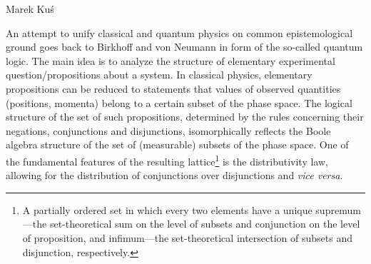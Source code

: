 \begin{artengenv}{Marek Ku\'s}

     

An attempt to unify classical and quantum physics on common epistemological ground goes back to Birkhoff and von Neumann \parencite*{birkhoff_logic_1936} in form of the so-called quantum logic. The main idea is to analyze the structure of elementary experimental question/propositions about a system. In classical physics, elementary propositions can be reduced to statements that values of observed quantities (positions, momenta) belong to a certain subset of the phase space. The logical structure of the set of such propositions, determined by the rules concerning their negations, conjunctions and disjunctions, isomorphically reflects the Boole algebra structure of the set of (measurable) subsets of  the phase space. One of the fundamental features of the resulting lattice\footnote{A partially ordered set in which every two elements have a unique supremum---the set-theoretical sum on the level of subsets and conjunction on the level of proposition, and infimum---the  set-theoretical intersection of subsets and disjunction, respectively.} is the distributivity law, allowing for the distribution of conjunctions over disjunctions and \textit{vice versa}.  


\end{artengenv}
